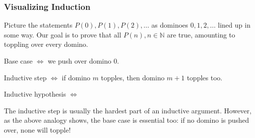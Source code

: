 \documentclass[11pt]{article}
\begin{document}
\subsubsection{Visualizing Induction}

Picture the statements $P(0), P(1), P(2), \ldots$ as dominoes $0, 1, 2, \ldots$
lined up in some way. Our goal is to prove that all $P(n), n \in \mathbb{N}$
are true, amounting to toppling over every domino.

\begin{center}
\end{center}
\begin{center}
\end{center}
Base case $\Leftrightarrow$ we push over domino 0.

Inductive step $\Leftrightarrow$ if domino $m$ topples, then domino $m+1$
topples too.

Inductive hypothesis $\Leftrightarrow$

\begin{remark}The inductive step is usually the hardest part of an inductive argument. However, as the above analogy shows, the base case is essential too: if no domino is pushed over, none will topple!
\end{remark}
\end{document}
